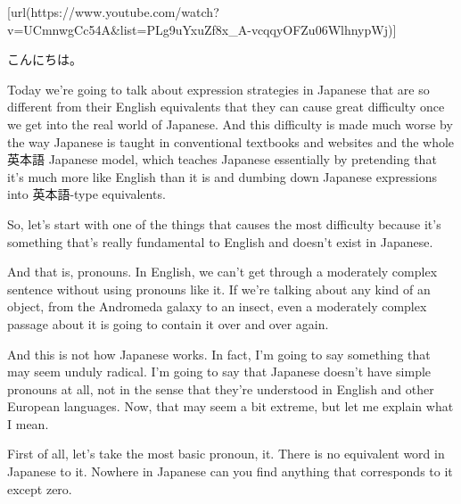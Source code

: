 \startsectionlevel[title={{\bf 75. Japanese is NOT English: How expression strategies differ \letterbar{} polite 英本語=rude Japanese}},reference={japanese-is-not-english-how-expression-strategies-differ-polite-英本語rude-japanese}]

[url(https://www.youtube.com/watch?v=UCmnwgCc54A&list=PLg9uYxuZf8x_A-vcqqyOFZu06WlhnypWj)]

こんにちは。

Today we're going to talk about expression strategies in Japanese that are so different from their English equivalents that they can cause great difficulty once we get into the real world of Japanese. {} And this difficulty is made much worse by the way Japanese is taught in conventional textbooks and websites and the whole 英本語 Japanese model, which teaches Japanese essentially by pretending that it's much more like English than it is and dumbing down Japanese expressions into 英本語-type equivalents.

So, let's start with one of the things that causes the most difficulty because it's something that's really fundamental to English and doesn't exist in Japanese.

{}

And that is, pronouns. In English, we can't get through a moderately complex sentence without using pronouns like it. If we're talking about any kind of an object, from the Andromeda galaxy to an insect, even a moderately complex passage about it is going to contain it over and over again.

And this is not how Japanese works. In fact, I'm going to say something that may seem unduly radical. I'm going to say that Japanese doesn't have simple pronouns at all, not in the sense that they're understood in English and other European languages. Now, that may seem a bit extreme, but let me explain what I mean.

{}

\startsectionlevel[title={Pronouns it, I and you in Japanese},reference={pronouns-it-i-and-you-in-japanese}]

First of all, let's take the most basic pronoun, it. There is no equivalent word in Japanese to it. Nowhere in Japanese can you find anything that corresponds to it except zero.

